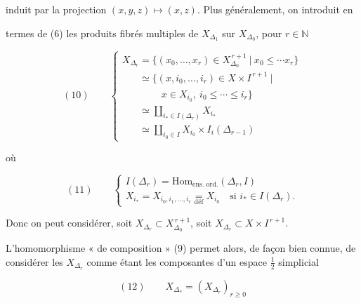 \documentclass[11pt,a4paper]{article}
\begin{document}

induit par la projection $(x,y,z) \mapsto (x,z)$. Plus généralement, on
introduit en

termes de (6) les produits fibrés multiples de $X_{\Delta_1}$ sur
$X_{\Delta_0}$, pour $r \in \mathbb{N}$

\[
  (10) \qquad
  \begin{cases}
    X_{\Delta_r} = \bigl\{ (x_0, \ldots, x_r) \in X_{\Delta_0}^{\,r+1}
      \ \big|\ x_0 \leq \cdots x_r \bigr\} \\[2pt]
    \phantom{X_{\Delta_r}} \simeq \bigl\{ (x, i_0, \ldots, i_r)
      \in X \times I^{\,r+1} \ \big| \\
    \qquad\qquad x \in X_{i_0},\ i_0 \leq \cdots \leq i_r \bigr\} \\[2pt]
    \phantom{X_{\Delta_r}} \simeq \coprod_{i_{*} \in I(\Delta_r)} X_{i_{*}} \\[2pt]
    \phantom{X_{\Delta_r}} \simeq \coprod_{i_0 \in I} X_{i_0} \times I_i(\Delta_{r-1})
  \end{cases}
\]

où

\[
  (11) \qquad
  \begin{cases}
    I(\Delta_r) = \mathrm{Hom}_{\text{ens. ord.}}(\Delta_r, I) \\[2pt]
    X_{i_{*}} = X_{i_0, i_1, \ldots, i_r} \underset{\text{déf}}{=} X_{i_0}
      \quad \text{si } i_{*} \in I(\Delta_r) .
  \end{cases}
\]


Donc on peut considérer, soit
$X_{\Delta_r} \subset X_{\Delta_0}^{\,r+1}$, soit
$X_{\Delta_r} \subset X \times I^{\,r+1}$.

L'homomorphisme « de composition » (9) permet alors, de façon bien connue, de
considérer les $X_{\Delta_r}$ comme étant les composantes d'un espace
$\tfrac{1}{2}$ simplicial

\[
  (12) \qquad X_{\Delta_{*}} = (X_{\Delta_r})_{r \geq 0}
\]
\end{document}
